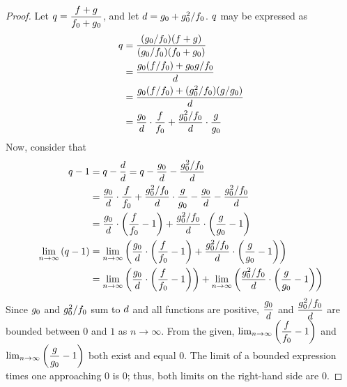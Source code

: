 \begin{proof}
	Let $q = \dfrac{f + g}{f_0 + g_0}$, and let $d = g_0 + g_0^2 / f_0$. $q$ may be expressed as
	\begin{align*}
	q &= \frac{(g_0 / f_0)(f + g)}{(g_0 / f_0)(f_0 + g_0)}\\
	&= \frac{g_0(f / f_0) + g_0g / f_0}{d}\\
	&= \frac{g_0(f / f_0) + (g_0^2 / f_0)(g / g_0)}{d}\\
	&= \frac{g_0}{d} \cdot \frac{f}{f_0} + \frac{g_0^2 / f_0}{d} \cdot \frac{g}{g_0}
	\end{align*}
	Now, consider that
	\begin{align*}
	q - 1 &= q - \frac{d}{d} = q - \frac{g_0}{d} - \frac{g_0^2 / f_0}{d}\\
	&= \frac{g_0}{d} \cdot \frac{f}{f_0} + \frac{g_0^2 / f_0}{d} \cdot \frac{g}{g_0} - \frac{g_0}{d} - \frac{g_0^2 / f_0}{d}\\
	&= \frac{g_0}{d} \cdot \left( \frac{f}{f_0} - 1 \right) + \frac{g_0^2 / f_0}{d} \cdot \left( \frac{g}{g_0} - 1 \right)\\
	\lim_{n \to \infty} \left( q - 1 \right) &= \lim_{n \to \infty} \left( \frac{g_0}{d} \cdot \left( \frac{f}{f_0} - 1 \right) + \frac{g_0^2 / f_0}{d} \cdot \left( \frac{g}{g_0} - 1 \right) \right)\\
	&= \lim_{n \to \infty} \left( \frac{g_0}{d} \cdot \left( \frac{f}{f_0} - 1 \right) \right) + \lim_{n \to \infty} \left( \frac{g_0^2 / f_0}{d} \cdot \left( \frac{g}{g_0} - 1 \right) \right)
	\end{align*}
	Since $g_0$ and $g_0^2 / f_0$ sum to $d$ and all functions are positive, $\dfrac{g_0}{d}$ and $\dfrac{g_0^2 / f_0}{d}$ are bounded between $0$ and $1$ as $n \to \infty$. From the given, $\lim_{n \to \infty} \left( \dfrac{f}{f_0} - 1 \right)$ and $\lim_{n \to \infty} \left( \dfrac{g}{g_0} - 1 \right)$ both exist and equal $0$. The limit of a bounded expression times one approaching $0$ is $0$; thus, both limits on the right-hand side are $0$.
	

\end{proof}
